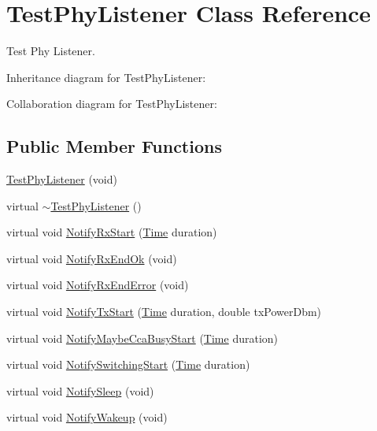 \hypertarget{classTestPhyListener}{}\section{Test\+Phy\+Listener Class Reference}
\label{classTestPhyListener}


Test Phy Listener.  




Inheritance diagram for Test\+Phy\+Listener\+:


Collaboration diagram for Test\+Phy\+Listener\+:
\subsection*{Public Member Functions}
\begin{DoxyCompactItemize}
\item 
\hyperlink{classTestPhyListener_a5c4ac2db62930c9d2ecdd1fe2d8f0e86}{Test\+Phy\+Listener} (void)
\item 
virtual \hyperlink{classTestPhyListener_a3b12e9fdefa89d78880139eacdcf2e07}{$\sim$\+Test\+Phy\+Listener} ()
\item 
virtual void \hyperlink{classTestPhyListener_a65075f1f8a36fa497cdecadeb8dbd5af}{Notify\+Rx\+Start} (\hyperlink{classns3_1_1Time}{Time} duration)
\item 
virtual void \hyperlink{classTestPhyListener_a3eeb1644f5159de33970cf8e14b03068}{Notify\+Rx\+End\+Ok} (void)
\item 
virtual void \hyperlink{classTestPhyListener_ac5c195c58fc7d71061aa830c3bbb4816}{Notify\+Rx\+End\+Error} (void)
\item 
virtual void \hyperlink{classTestPhyListener_a560db39b87219ee7327204937e0d852b}{Notify\+Tx\+Start} (\hyperlink{classns3_1_1Time}{Time} duration, double tx\+Power\+Dbm)
\item 
virtual void \hyperlink{classTestPhyListener_a908057135997e3ec91d54182442d006a}{Notify\+Maybe\+Cca\+Busy\+Start} (\hyperlink{classns3_1_1Time}{Time} duration)
\item 
virtual void \hyperlink{classTestPhyListener_aec632f149ef5541ac1d95580fa4d4ef5}{Notify\+Switching\+Start} (\hyperlink{classns3_1_1Time}{Time} duration)
\item 
virtual void \hyperlink{classTestPhyListener_a39d52e46a2443a6ef75521b9ff10f63d}{Notify\+Sleep} (void)
\item 
virtual void \hyperlink{classTestPhyListener_a61f67e2cc077c72d5b8473324a9ba1b0}{Notify\+Wakeup} (void)
\end{DoxyCompactItemize}
